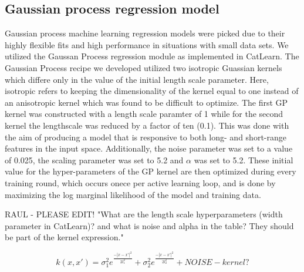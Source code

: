 \subsection{Gaussian process regression model}  %
%


%
%
Gaussian process machine learning regression models were picked due to their highly flexible fits and high performance in situations with small data sets.
%
We utilized the Gaussan Process regression module as implemented in CatLearn.
\cite{hansen2019atomistic,CatLearn_Repo}
%
The Gaussian Process recipe we developed utilized two isotropic Guassian kernels which differe only in the value of the initial length scale parameter.
%
Here, isotropic refers to keeping the dimensionality of the kernel equal to one instead of an anisotropic kernel which was found to be difficult to optimize.
%
The first GP kernel was constructed with a length scale paramter of 1 while for the second kernel the lengthscale was reduced by a factor of ten (0.1).
%
This was done with the aim of producing a model that is responsive to both long- and short-range features in the input space.
%
Additionally, the noise parameter was set to a value of \num{0.025}, the scaling parameter was set to \num{5.2} and $\alpha$ was set to 5.2.
%
These initial value for the hyper-parameters of the GP kernel are then optimized during every training round,
which occurs onece per active learning loop,
and is done by maximizing the log marginal likelihood of the model and training data.


RAUL - PLEASE EDIT! "What are the length scale hyperparameters (width parameter in CatLearn)? and what is noise and alpha in the table? They should be part of the kernel expression."

\begin{equation}
    k(x,x') = \sigma_1^ 2 e^{\frac{-|x-x'|^2}{2l_1^2}} + \sigma_2^ 2 e^{\frac{-|x-x'|^2}{2l_2^2}} + NOISE-kernel?
\end{equation}



